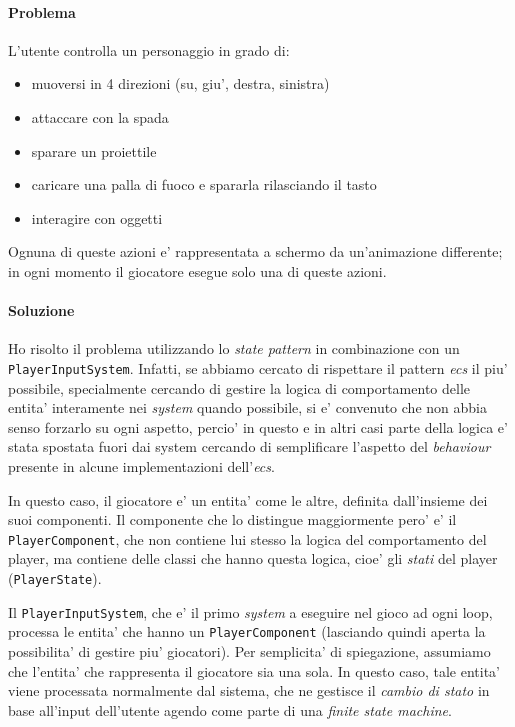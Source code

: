 \documentclass[a4paper,12pt]{report}
\begin{document}
\paragraph{Problema}
L'utente controlla un personaggio in grado di:

\begin{itemize}
	\item muoversi in 4 direzioni (su, giu', destra, sinistra)
	\item attaccare con la spada
	\item sparare un proiettile
	\item caricare una palla di fuoco e spararla rilasciando il tasto
	\item interagire con oggetti
\end{itemize}

Ognuna di queste azioni e' rappresentata a schermo da un'animazione differente; in ogni momento il giocatore esegue solo una di queste azioni.

\paragraph{Soluzione}
Ho risolto il problema utilizzando lo \textit{state pattern} in combinazione con un \texttt{PlayerInputSystem}. Infatti, se abbiamo cercato di rispettare il pattern \textit{ecs} il piu' possibile, specialmente cercando di gestire la logica di comportamento delle entita' interamente nei \textit{system} quando possibile, si e' convenuto che non abbia senso forzarlo su ogni aspetto, percio' in questo e in altri casi parte della logica e' stata spostata fuori dai system cercando di semplificare l'aspetto del \textit{behaviour} presente in alcune implementazioni dell'\textit{ecs}. 

In questo caso, il giocatore e' un entita' come le altre, definita dall'insieme dei suoi componenti. Il componente che lo distingue maggiormente pero' e' il \texttt{PlayerComponent}, che non contiene lui stesso la logica del comportamento del player, ma contiene delle classi che hanno questa logica, cioe' gli \textit{stati} del player (\texttt{PlayerState}). 

Il \texttt{PlayerInputSystem}, che e' il primo \textit{system} a eseguire nel gioco ad ogni loop, processa le entita' che hanno un \texttt{PlayerComponent} (lasciando quindi aperta la possibilita' di gestire piu' giocatori). Per semplicita' di spiegazione, assumiamo che l'entita' che rappresenta il giocatore sia una sola. In questo caso, tale entita' viene processata normalmente dal sistema, che ne gestisce il \textit{cambio di stato} in base all'input dell'utente agendo come parte di una \textit{finite state machine}.
\end{document}
